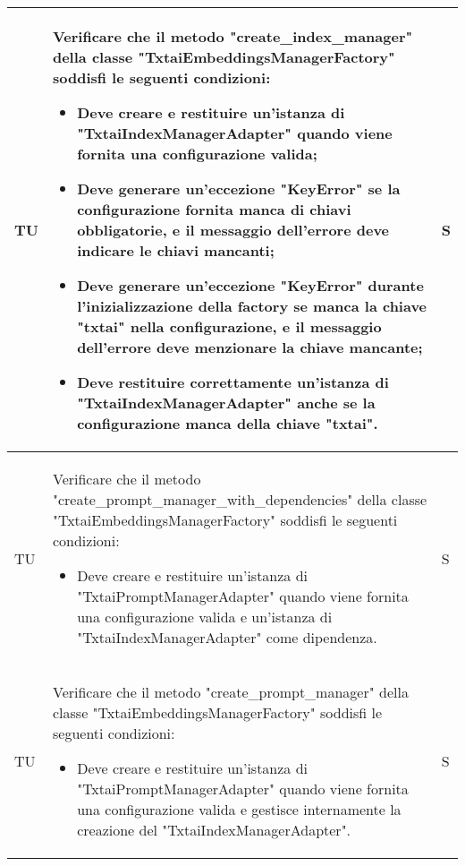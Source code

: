 \begin{adjustwidth}{-0.5cm}{-0.5cm}
\begin{longtable}{|P{1.5cm}|>{\raggedright}P{9.5cm}|>{\arraybackslash}P{1.5cm}|}
		\hline TU & Verificare che il metodo "create\_index\_manager" della classe "TxtaiEmbeddingsManagerFactory" soddisfi le seguenti condizioni:
		\begin{itemize}
			\item Deve creare e restituire un'istanza di "TxtaiIndexManagerAdapter" quando viene fornita una configurazione valida;
			\item Deve generare un'eccezione "KeyError" se la configurazione fornita manca di chiavi obbligatorie, e il messaggio dell'errore deve indicare le chiavi mancanti;
			\item Deve generare un'eccezione "KeyError" durante l'inizializzazione della factory se manca la chiave "txtai" nella configurazione, e il messaggio dell'errore deve menzionare la chiave mancante;
			\item Deve restituire correttamente un'istanza di "TxtaiIndexManagerAdapter" anche se la configurazione manca della chiave "txtai".
		\end{itemize} & S \\

		\hline TU & Verificare che il metodo "create\_prompt\_manager\_with\_dependencies" della classe "TxtaiEmbeddingsManagerFactory" soddisfi le seguenti condizioni:
		\begin{itemize}
			\item Deve creare e restituire un'istanza di "TxtaiPromptManagerAdapter" quando viene fornita una configurazione valida e un'istanza di "TxtaiIndexManagerAdapter" come dipendenza.
		\end{itemize} & S \\

		\hline TU & Verificare che il metodo "create\_prompt\_manager" della classe "TxtaiEmbeddingsManagerFactory" soddisfi le seguenti condizioni:
		\begin{itemize}
			\item Deve creare e restituire un'istanza di "TxtaiPromptManagerAdapter" quando viene fornita una configurazione valida e gestisce internamente la creazione del "TxtaiIndexManagerAdapter".
		\end{itemize} & S \\


\end{longtable}
\end{adjustwidth}
